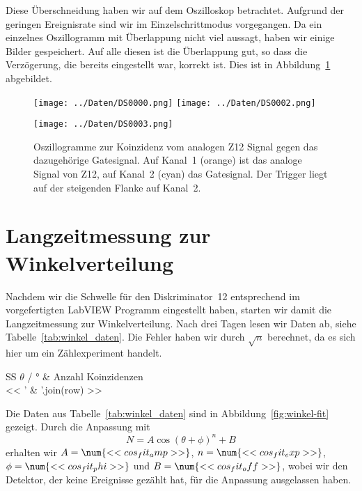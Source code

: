 \documentclass[11pt, ngerman, fleqn, DIV=15, headinclude, BCOR=2cm]{scrreprt}
\begin{document}
Diese Überschneidung haben wir auf dem Oszilloskop betrachtet. Aufgrund der
geringen Ereignisrate sind wir im Einzelschrittmodus vorgegangen. Da ein
einzelnes Oszillogramm mit Überlappung nicht viel aussagt, haben wir einige Bilder
gespeichert. Auf alle diesen ist die Überlappung gut, so dass die Verzögerung,
die bereits eingestellt war, korrekt ist. Dies ist in
Abbildung~\ref{fig:koinzidenz} abgebildet.

\begin{figure}[htbp]
    \centering
    \texttt{[image: ../Daten/DS0000.png]}
    \hfill
    \texttt{[image: ../Daten/DS0002.png]}

    \vspace*{5ex}

    \texttt{[image: ../Daten/DS0003.png]}
    \caption{%
        Oszillogramme zur Koinzidenz vom analogen Z12 Signal gegen das
        dazugehörige Gatesignal. Auf Kanal~1 (orange) ist das analoge Signal
        von Z12, auf Kanal~2 (cyan) das Gatesignal. Der Trigger liegt auf der
        steigenden Flanke auf Kanal~2.
    }
    \label{fig:koinzidenz}
\end{figure}

\section{Langzeitmessung zur Winkelverteilung}
\label{sec:langzeit_winkel}

Nachdem wir die Schwelle für den Diskriminator~12 entsprechend im
vorgefertigten LabVIEW Programm eingestellt haben, starten wir damit die
Langzeitmessung zur Winkelverteilung. Nach drei Tagen lesen wir Daten ab, siehe
Tabelle~\ref{tab:winkel_daten}. Die Fehler haben wir durch $\sqrt n$ berechnet,
da es sich hier um ein Zählexperiment handelt.

\begin{table}[htbp]
    \centering
    \begin{tabular}{SS}
        {$\theta$ / \si\degree} & {Anzahl Koinzidenzen} \\
        \midrule
        << ' & '.join(row) >> \\
    \end{tabular}
    \caption{%
        Anzahl der Koinzidenzen für die verschiedenen Raumrichtungen.
    }
    \label{tab:winkel_daten}
\end{table}

Die Daten aus Tabelle~\ref{tab:winkel_daten} sind in Abbildung~\ref{fig:winkel-fit}
gezeigt. Durch die Anpassung mit
\[
    N = A \cos(\theta + \phi)^n + B
\]
erhalten wir $A = \num{<< cos_fit_amp >>}$, $n = \num{<< cos_fit_exp >>}$,
$\phi = \num{<< cos_fit_phi >>}$ und $B = \num{<< cos_fit_off >> }$, 
wobei wir den Detektor, der keine Ereignisse gezählt hat, für die
Anpassung ausgelassen haben.
\end{document}
